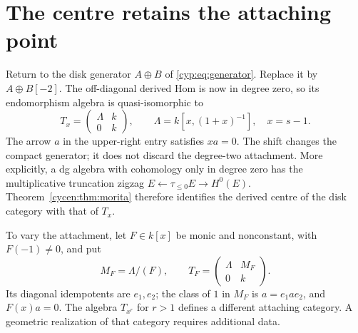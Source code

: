 \section{The centre retains the attaching point}
\label{cycen:sec:attached}

Return to the disk generator $A\oplus B$ of
\eqref{cyp:eq:generator}. Replace it by $A\oplus B[-2]$.
The off-diagonal derived Hom is now in degree zero, so its
endomorphism algebra is quasi-isomorphic to
\begin{equation}\label{cycen:eq:simple}
 T_x=\begin{pmatrix}\Lambda&k\\0&k\end{pmatrix},
 \qquad \Lambda=k[x,(1+x)^{-1}],\quad x=s-1.
\end{equation}
The arrow $a$ in the upper-right entry satisfies $xa=0$.
The shift changes the compact generator; it does not discard
the degree-two attachment. More explicitly, a dg algebra with
cohomology only in degree zero has the multiplicative truncation
zigzag $E\leftarrow\tau_{\leq0}E\to H^0(E)$.
Theorem~\ref{cycen:thm:morita} therefore identifies the derived
centre of the disk category with that of $T_x$.

To vary the attachment, let $F\in k[x]$ be monic and
nonconstant, with $F(-1)\ne0$, and put
\begin{equation}\label{cycen:eq:attached-family}
 M_F=\Lambda/(F),\qquad
 T_F=\begin{pmatrix}\Lambda&M_F\\0&k\end{pmatrix}.
\end{equation}
Its diagonal idempotents are $e_1,e_2$; the class of $1$ in
$M_F$ is $a=e_1ae_2$, and $F(x)a=0$. The algebra $T_{x^r}$
for $r>1$ defines a different attaching category. A geometric
realization of that category requires additional data.

